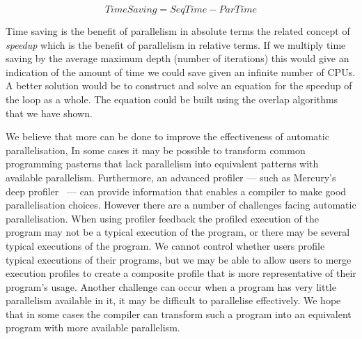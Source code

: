 \begin{equation*}
TimeSaving = SeqTime - ParTime
\end{equation*}

\noindent
Time saving is the benefit of parallelism in absolute terms
the related concept of \emph{speedup} which is the benefit of parallelism in
relative terms.
If we multiply time saving by the average maximum depth (number of
iterations) this would give an indication of the amount of time we could
save given an infinite number of CPUs.
A better solution would be to construct and solve an equation for the
speedup of the loop as a whole.
The equation could be built using the overlap algorithms that we have shown.



We believe that more can be done to improve the effectiveness of
automatic parallelisation,
In some cases it may be possible to transform common programming
pasterns that lack parallelism into equivalent patterns with available
parallelism.
Furthermore, an advanced profiler --- such as Mercury's deep
profiler~\citep{conway:2001:mercury-deep} --- can provide information
that enables a compiler to make good parallelisation choices.
However there are a number of challenges facing automatic
parallelisation.
When using profiler feedback the profiled execution of the program may
not be a typical execution of the program, or there may be several
typical executions of the program.
We cannot control whether users profile typical executions of their
programs, but we may be able to allow users to merge execution
profiles to create a composite profile that is more representative of
their program's usage.
Another challenge can occur when a program has very little parallelism
available in it, it may be difficult to parallelise effectively.
We hope that in some cases the compiler can transform such a program
into an equivalent program with more available parallelism.

%
